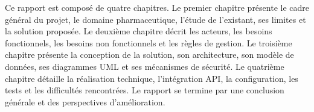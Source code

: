 Ce rapport est composé de quatre chapitres. Le premier chapitre présente le cadre général du projet, le
domaine pharmaceutique, l'étude de l'existant, ses limites et la solution proposée. Le deuxième chapitre
décrit les acteurs, les besoins fonctionnels, les besoins non fonctionnels et les règles de gestion. Le
troisième chapitre présente la conception de la solution, son architecture, son modèle de données, ses
diagrammes UML et ses mécanismes de sécurité. Le quatrième chapitre détaille la réalisation technique,
l'intégration API, la configuration, les tests et les difficultés rencontrées. Le rapport se termine par une
conclusion générale et des perspectives d'amélioration.
